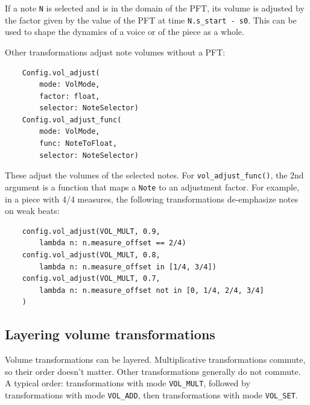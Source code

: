 \documentclass[letterpaper, 12pt]{article}
\begin{document}
If a note \texttt{N} is selected and is in the domain of the PFT,
its volume is adjusted by the factor given
by the value of the PFT at time \texttt{N.s\_start - s0}.
This can be used to shape the dynamics of a voice or of the piece as a whole.

Other transformations adjust note volumes without a PFT:
\begin{small}\begin{singlespace}\vspace{-18px}\begin{verbatim}
    Config.vol_adjust(
        mode: VolMode,
        factor: float,
        selector: NoteSelector)
    Config.vol_adjust_func(
        mode: VolMode,
        func: NoteToFloat,
        selector: NoteSelector)
\end{verbatim}\end{singlespace}\end{small}\vspace{-18px}\noindent
These adjust the volumes of the selected notes.
For \texttt{vol\_adjust\_func()}, the 2nd argument is a function
that maps a \texttt{Note} to an adjustment factor.
For example, in a piece with 4/4 measures,
the following transformations de-emphasize notes on weak beats:
\begin{small}\begin{singlespace}\vspace{-18px}\begin{verbatim}
    config.vol_adjust(VOL_MULT, 0.9,
        lambda n: n.measure_offset == 2/4)
    config.vol_adjust(VOL_MULT, 0.8,
        lambda n: n.measure_offset in [1/4, 3/4])
    config.vol_adjust(VOL_MULT, 0.7,
        lambda n: n.measure_offset not in [0, 1/4, 2/4, 3/4]
    )
\end{verbatim}\end{singlespace}\end{small}\vspace{-18px}\noindent

\subsection{Layering volume transformations}

Volume transformations can be layered.
Multiplicative transformations commute, so their order doesn't matter.
Other transformations generally do not commute.
A typical order:
transformations with mode \texttt{VOL\_MULT},
followed by transformations with mode \texttt{VOL\_ADD},
then transformations with mode \texttt{VOL\_SET}.
\end{document}
